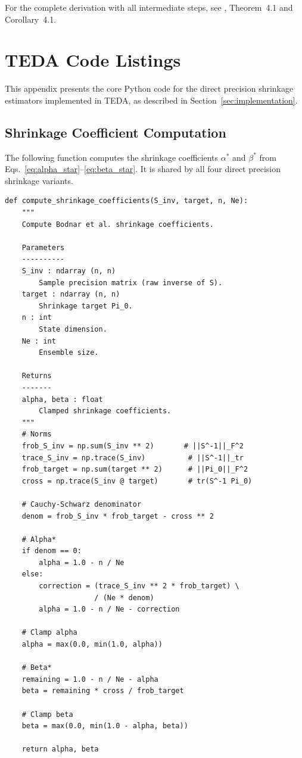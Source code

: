 For the complete derivation with all intermediate steps, see \citep{bodnar2016direct}, Theorem~4.1 and Corollary~4.1.

\chapter{TEDA Code Listings}
\label{app:code}

This appendix presents the core Python code for the direct precision shrinkage estimators implemented in TEDA, as described in Section~\ref{sec:implementation}.

\section{Shrinkage Coefficient Computation}

The following function computes the shrinkage coefficients $\alpha^*$ and $\beta^*$ from Eqs.~\eqref{eq:alpha_star}--\eqref{eq:beta_star}. It is shared by all four direct precision shrinkage variants.

\begin{verbatim}
def compute_shrinkage_coefficients(S_inv, target, n, Ne):
    """
    Compute Bodnar et al. shrinkage coefficients.

    Parameters
    ----------
    S_inv : ndarray (n, n)
        Sample precision matrix (raw inverse of S).
    target : ndarray (n, n)
        Shrinkage target Pi_0.
    n : int
        State dimension.
    Ne : int
        Ensemble size.

    Returns
    -------
    alpha, beta : float
        Clamped shrinkage coefficients.
    """
    # Norms
    frob_S_inv = np.sum(S_inv ** 2)       # ||S^-1||_F^2
    trace_S_inv = np.trace(S_inv)          # ||S^-1||_tr
    frob_target = np.sum(target ** 2)      # ||Pi_0||_F^2
    cross = np.trace(S_inv @ target)       # tr(S^-1 Pi_0)

    # Cauchy-Schwarz denominator
    denom = frob_S_inv * frob_target - cross ** 2

    # Alpha*
    if denom == 0:
        alpha = 1.0 - n / Ne
    else:
        correction = (trace_S_inv ** 2 * frob_target) \
                     / (Ne * denom)
        alpha = 1.0 - n / Ne - correction

    # Clamp alpha
    alpha = max(0.0, min(1.0, alpha))

    # Beta*
    remaining = 1.0 - n / Ne - alpha
    beta = remaining * cross / frob_target

    # Clamp beta
    beta = max(0.0, min(1.0 - alpha, beta))

    return alpha, beta
\end{verbatim}

